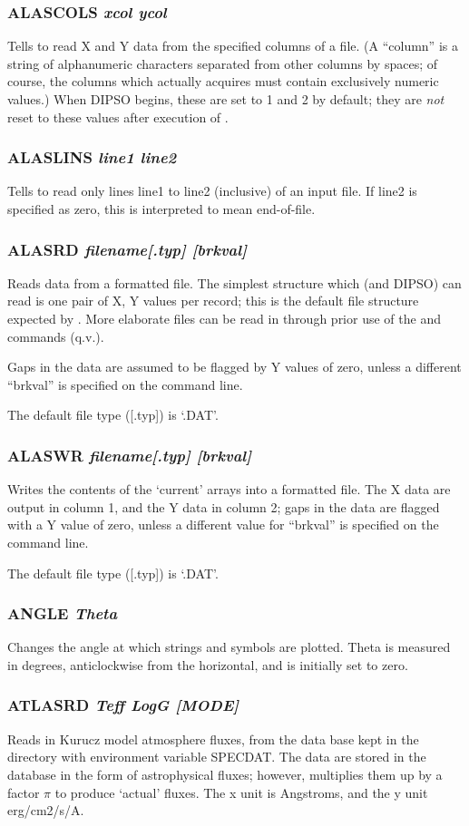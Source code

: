 \documentclass[twoside,11pt,noabs,nolof]{starlink}
\providecommand{\dipcom}[3]{\subsubsection*{\label{COM:#1}\textbf{#1} \emph{#2}}}
\begin{document}
\dipcom{ALASCOLS}{xcol ycol}{Sets the columns to be read by {\texttt{ALASRD}}}
Tells   to read X and Y data from the specified columns of a
file. (A ``column'' is a string of alphanumeric characters separated
from other columns by spaces; of course, the columns which 
actually acquires must contain exclusively numeric values.) When DIPSO
begins, these are set to 1 and 2 by default; they are \emph{not} reset
to these values after execution of .

\dipcom{ALASLINS}{line1 line2}{Sets the lines to be read by {\texttt{ALASRD}}}
Tells   to read only lines line1 to line2 (inclusive) of an input
file. If line2 is specified as zero, this is interpreted to mean
end-of-file.

\dipcom{ALASRD}{filename[.typ] [brkval]}{Reads in data from a text file}
Reads data from a formatted file. The simplest structure which 
(and DIPSO) can read is one pair of X, Y values per record; this is
the default file structure expected by .  More elaborate files
can be read in through prior use of the   and   commands
(q.v.).

Gaps in the data are assumed to be flagged by Y values of zero, unless
a different ``brkval'' is specified on the command line.

The default file type ([.typ]) is `.DAT'.

\dipcom{ALASWR}{filename[.typ] [brkval]}{Writes the contents of the current arrays to a text file}
Writes the contents of the `current' arrays into a formatted file. The
X data are output in column 1, and the Y data in column 2; gaps in the
data are flagged with a Y value of zero, unless a different value for
``brkval'' is specified on the command line.

The default file type ([.typ]) is `.DAT'.

\dipcom{ANGLE}{Theta}{Sets orientation of text and symbols plotted by {\texttt{PWRITE}}  and {\texttt{MARK}} }
Changes the angle at which   strings and   symbols are
plotted. Theta is measured in degrees, anticlockwise from the
horizontal, and is initially set to zero.

\dipcom{ATLASRD}{Teff LogG [MODE]}{Reads in Kurucz model atmosphere fluxes}
Reads in Kurucz model atmosphere fluxes, from the data base kept in
the directory with environment variable SPECDAT. The
data are stored in the database in the form of astrophysical fluxes;
however,   multiplies them up by a factor $\pi$ to produce
`actual' fluxes. The x unit is Angstroms, and the y unit erg/cm2/s/A.
\end{document}
